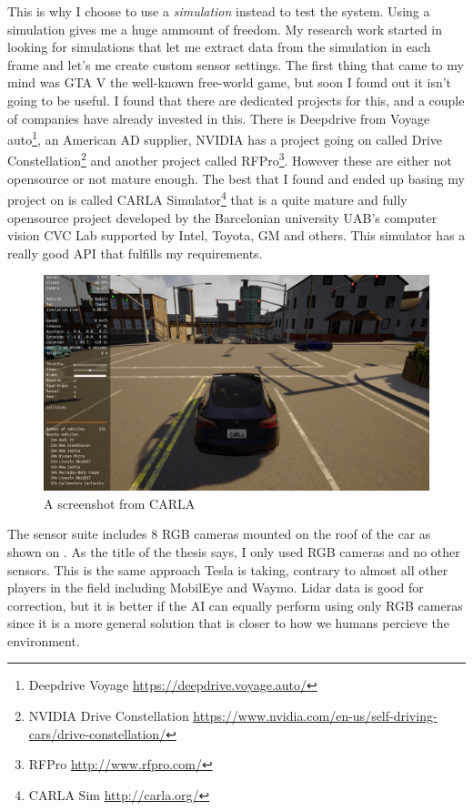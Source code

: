 This is why I choose to use a \emph{simulation} instead to test the system.
Using a simulation gives me a huge ammount of freedom. My research work started
in looking for simulations that let me extract data from the simulation in each
frame and let's me create custom sensor settings. The first thing that came to
my mind was GTA V the well-known free-world game, but soon I found out it isn't
going to be useful. I found that there are dedicated projects for this, and a
couple of companies have already invested in this. There is Deepdrive from
Voyage auto\footnote{Deepdrive Voyage \url{https://deepdrive.voyage.auto/}}, an
American AD supplier, NVIDIA has a project going on called Drive
Constellation\footnote{NVIDIA Drive Constellation
\url{https://www.nvidia.com/en-us/self-driving-cars/drive-constellation/}} and
another project called RFPro\footnote{RFPro \url{http://www.rfpro.com/}}.
However these are either not opensource or not mature enough. The best that I
found and ended up basing my project on is called CARLA Simulator\footnote{CARLA
Sim \url{http://carla.org/}} \cite{Dosovitskiy17} that is a quite mature and
fully opensource project developed by the Barcelonian university UAB's computer
vision CVC Lab supported by Intel, Toyota, GM and others. This simulator has a
really good API that fulfills my requirements.

\begin{figure}[!ht]
    \centering
    \includegraphics[width=150mm, keepaspectratio]{figures/carla.png}
    \caption{A screenshot from CARLA}
    \label{fig:carla}
\end{figure}

The sensor suite includes 8 RGB cameras mounted on the roof of the car as shown
on . As the title of the thesis says, I only used RGB
cameras and no other sensors. This is the same approach Tesla is taking,
contrary to almost all other players in the field including MobilEye and Waymo.
Lidar data is good for correction, but it is better if the AI can equally
perform using only RGB cameras since it is a more general solution that is
closer to how we humans percieve the environment.

